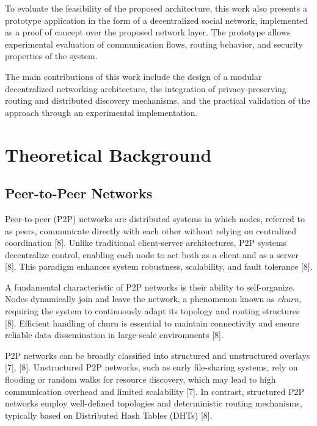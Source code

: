 \documentclass[12pt]{article}
\begin{document}
To evaluate the feasibility of the proposed architecture, this work also presents a prototype application in the form of a decentralized social network, implemented as a proof of concept over the proposed network layer. The prototype allows experimental evaluation of communication flows, routing behavior, and security properties of the system.

The main contributions of this work include the design of a modular decentralized networking architecture, the integration of privacy-preserving routing and distributed discovery mechanisms, and the practical validation of the approach through an experimental implementation.







\section{Theoretical Background}

\subsection{Peer-to-Peer Networks}

Peer-to-peer (P2P) networks are distributed systems in which nodes, referred to as peers, communicate directly with each other without relying on centralized coordination [8]. Unlike traditional client-server architectures, P2P systems decentralize control, enabling each node to act both as a client and as a server [8]. This paradigm enhances system robustness, scalability, and fault tolerance [8].

A fundamental characteristic of P2P networks is their ability to self-organize. Nodes dynamically join and leave the network, a phenomenon known as \textit{churn}, requiring the system to continuously adapt its topology and routing structures [8]. Efficient handling of churn is essential to maintain connectivity and ensure reliable data dissemination in large-scale environments [8].

P2P networks can be broadly classified into structured and unstructured overlays [7], [8]. Unstructured P2P networks, such as early file-sharing systems, rely on flooding or random walks for resource discovery, which may lead to high communication overhead and limited scalability [7]. In contrast, structured P2P networks employ well-defined topologies and deterministic routing mechanisms, typically based on Distributed Hash Tables (DHTs) [8].
\end{document}
